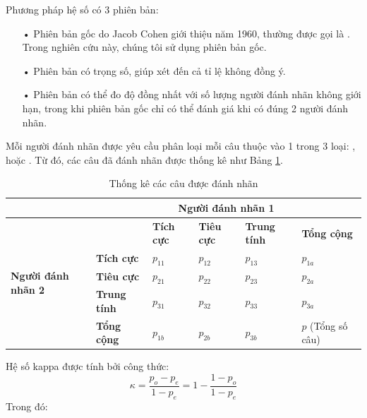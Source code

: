Phương pháp hệ số  có 3 phiên bản:
\begin{itemize}
\item[•] Phiên bản gốc do Jacob Cohen giới thiệu năm 1960, thường được gọi là . Trong nghiên cứu này, chúng tôi sử dụng phiên bản gốc.
\item[•] Phiên bản  có trọng số, giúp xét đến cả tỉ lệ không đồng ý.
\item[•] Phiên bản  có thể đo độ đồng nhất với số lượng người đánh nhãn không giới hạn, trong khi phiên bản gốc chỉ có thể đánh giá khi có đúng 2 người đánh nhãn.
\end{itemize}
Mỗi người đánh nhãn được yêu cầu phân loại mỗi câu thuộc vào 1 trong 3 loại: \tichcuc, \tieucuc hoặc \trungtinh. Từ đó, các câu đã đánh nhãn được thống kê như Bảng \ref{table:kappa}.
\begin{table}[t]
\caption{Thống kê các câu được đánh nhãn} \label{table:kappa}
\begin{tabular}{|m{2cm}|l|l|l|l|l|}
\hline
	& \multicolumn{5}{c|}{\textbf{Người đánh nhãn 1}}                                                                \\ \hline
\multirow{5}{2cm}{\textbf{Người đánh nhãn 2}} & \textbf{}           & \textbf{Tích cực} & \textbf{Tiêu cực} & \textbf{Trung tính} & \textbf{Tổng cộng}         \\ \cline{2-6} 
                                            & \textbf{Tích cực}   & $p_{11}$          & $p_{12}$          & $p_{13}$            & $p_{1a}$                      \\ \cline{2-6} 
                                            & \textbf{Tiêu cực}   & $p_{21}$          & $p_{22}$          & $p_{23}$            & $p_{2a}$                      \\ \cline{2-6} 
                                            & \textbf{Trung tính} & $p_{31}$          & $p_{32}$          & $p_{33}$            & $p_{3a}$                      \\ \cline{2-6} 
                                            & \textbf{Tổng cộng}  & $p_{1b}$             & $p_{2b}$             & $p_{3b}$               & $p$ (Tổng số câu) \\ \hline
\end{tabular}
\end{table}
Hệ số kappa được tính bởi công thức:
$$\kappa = \dfrac{p_o - p_e}{1 - p_e} = 1 - \dfrac{1-p_o}{1-p_e}$$
Trong đó:
